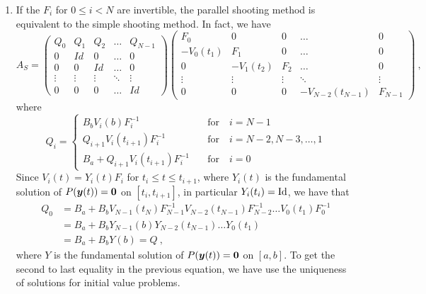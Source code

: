 \begin{rmkList} \label{ParShootPartSepRmk}
\begin{enumerate}
\item If the $F_i$ for $0 \leq i < N$ are invertible, the
parallel shooting method is equivalent to the simple shooting method.
In fact, we have
\[
A_S = \begin{pmatrix} Q_0 & Q_1 & Q_2 & \ldots & Q_{N-1} \\
0 & Id & 0 & \ldots & 0 \\
0 & 0 & Id & \ldots & 0 \\
\vdots & \vdots & \vdots & \ddots & \vdots \\
0 & 0 & 0 & \ldots & Id
\end{pmatrix}
\begin{pmatrix} F_0 & 0 & 0 & \ldots & 0 \\
-V_0(t_1) & F_1 & 0 & \ldots & 0 \\
0 & -V_1(t_2) & F_2 & \ldots & 0 \\
\vdots & \vdots & \vdots & \ddots & \vdots \\
0 & 0 & 0 & -V_{N-2}(t_{N-1}) & F_{N-1}
\end{pmatrix} \ ,
\]
where
\[
Q_i =
\begin{cases}
B_b V_i(b)F_i^{-1} & \quad \text{for} \quad i = N-1 \\
Q_{i+1} V_i(t_{i+1}) F_i^{-1} & \quad \text{for} \quad  i= N-2, N-3, \ldots, 1 \\
B_a + Q_{i+1} V_i(t_{i+1})F_i^{-1} & \quad \text{for} \quad i = 0
\end{cases}
\]
Since $V_i(t) = Y_i(t) F_i$ for $t_i \leq t \leq t_{i+1}$,
where $Y_i(t)$ is the fundamental solution of $P(\bm{y}(t)) =\bm{0}$
on $[t_i,t_{i+1}]$, in particular $Y_i(t_i) = \operatorname{Id}$, we have
that
\begin{align*}
Q_0 &= B_a + B_b V_{N-1}(t_N)F_{N-1}^{-1} V_{N-2}(t_{N-1})F_{N-2}^{-1}
\ldots V_0(t_1)F_0^{-1} \\
&= B_a + B_b Y_{N-1}(b) Y_{N-2}(t_{N-1}) \ldots Y_0(t_1) \\
&= B_a + B_b Y(b) = Q \ ,
\end{align*}
where $Y$ is the fundamental solution of
$P(\bm{y}(t)) = \bm{0}$ on $[a,b]$.  To get the second to last
equality in the previous equation, we have use the uniqueness of
solutions for initial value problems.


\end{enumerate}
\end{rmkList}
